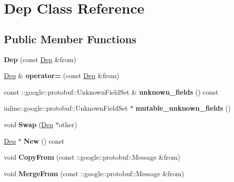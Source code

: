 \hypertarget{classDep}{
\section{Dep Class Reference}
\label{classDep}
}
\subsection*{Public Member Functions}
\begin{DoxyCompactItemize}
\item 
\hypertarget{classDep_a80362e936565b55abb269a18fde4dc59}{
{\bfseries Dep} (const \hyperlink{classDep}{Dep} \&from)}
\label{classDep_a80362e936565b55abb269a18fde4dc59}

\item 
\hypertarget{classDep_a87fdb64571ed9949e3fa5acdb9b367f9}{
\hyperlink{classDep}{Dep} \& {\bfseries operator=} (const \hyperlink{classDep}{Dep} \&from)}
\label{classDep_a87fdb64571ed9949e3fa5acdb9b367f9}

\item 
\hypertarget{classDep_a03cf321c0a637f65d4775ee8b63e2438}{
const ::google::protobuf::UnknownFieldSet \& {\bfseries unknown\_\-fields} () const }
\label{classDep_a03cf321c0a637f65d4775ee8b63e2438}

\item 
\hypertarget{classDep_af6070821655e8abd2054d0248896ed71}{
inline::google::protobuf::UnknownFieldSet $\ast$ {\bfseries mutable\_\-unknown\_\-fields} ()}
\label{classDep_af6070821655e8abd2054d0248896ed71}

\item 
\hypertarget{classDep_a89fd3d7654cbf49a112ee30ebe30a8f4}{
void {\bfseries Swap} (\hyperlink{classDep}{Dep} $\ast$other)}
\label{classDep_a89fd3d7654cbf49a112ee30ebe30a8f4}

\item 
\hypertarget{classDep_a27a82cb1d879df26d1cc89f5e10eacc2}{
\hyperlink{classDep}{Dep} $\ast$ {\bfseries New} () const }
\label{classDep_a27a82cb1d879df26d1cc89f5e10eacc2}

\item 
\hypertarget{classDep_a26c81c96d8bc499af3e3190127ae4f14}{
void {\bfseries CopyFrom} (const ::google::protobuf::Message \&from)}
\label{classDep_a26c81c96d8bc499af3e3190127ae4f14}

\item 
\hypertarget{classDep_a8521cee2d2c20cc3374caee792879d24}{
void {\bfseries MergeFrom} (const ::google::protobuf::Message \&from)}
\label{classDep_a8521cee2d2c20cc3374caee792879d24}


\end{DoxyCompactItemize}
